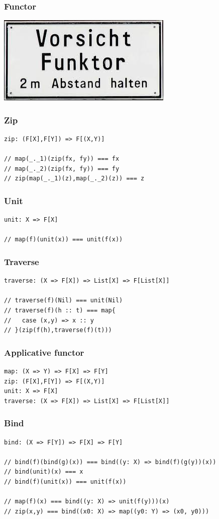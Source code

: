 \documentclass{beamer}
\begin{document}
\begin{frame}
\frametitle{Functor}
\includegraphics{funktor.jpeg}
\end{frame}

\begin{frame}[fragile]
\frametitle{Zip}
\begin{lstlisting}
zip: (F[X],F[Y]) => F[(X,Y)]

// map(_._1)(zip(fx, fy)) === fx
// map(_._2)(zip(fx, fy)) === fy
// zip(map(_._1)(z),map(_._2)(z)) === z
\end{lstlisting}
\end{frame}

\begin{frame}[fragile]
\frametitle{Unit}
\begin{lstlisting}
unit: X => F[X]

// map(f)(unit(x)) === unit(f(x))
\end{lstlisting}
\end{frame}

\begin{frame}[fragile]
\frametitle{Traverse}
\begin{lstlisting}
traverse: (X => F[X]) => List[X] => F[List[X]]

// traverse(f)(Nil) === unit(Nil)
// traverse(f)(h :: t) === map{
//   case (x,y) => x :: y
// }(zip(f(h),traverse(f)(t)))
\end{lstlisting}
\end{frame}

\begin{frame}[fragile]
\frametitle{Applicative functor}
\begin{lstlisting}
map: (X => Y) => F[X] => F[Y]
zip: (F[X],F[Y]) => F[(X,Y)]
unit: X => F[X]
traverse: (X => F[X]) => List[X] => F[List[X]]
\end{lstlisting}
\end{frame}

\begin{frame}[fragile]
\frametitle{Bind}
\begin{lstlisting}
bind: (X => F[Y]) => F[X] => F[Y]

// bind(f)(bind(g)(x)) === bind((y: X) => bind(f)(g(y))(x))
// bind(unit)(x) === x
// bind(f)(unit(x)) === unit(f(x))

// map(f)(x) === bind((y: X) => unit(f(y)))(x)
// zip(x,y) === bind((x0: X) => map((y0: Y) => (x0, y0)))
\end{lstlisting}
\end{frame}
\end{document}
